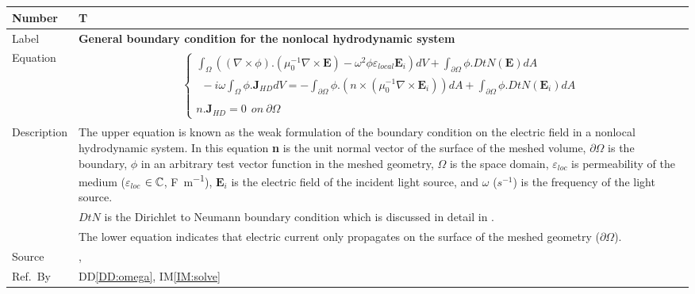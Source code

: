 \documentclass[12pt]{article}
\newcommand{\colBwidth}{0.82\textwidth} \newcommand{\colCwidth}{0.1\textwidth}
\begin{document}
	~\newline
	
	~\newline
	
	\noindent \begin{minipage}{\textwidth} \renewcommand*{\arraystretch}{1.5}
		\begin{tabular}{| p{\colAwidth} | p{\colBwidth}|} \hline \rowcolor[gray]{0.9}
			Number& T{theorynum}\thetheorynum \label{TM:boundary}\\ \hline
			Label&\bf General boundary condition for the nonlocal hydrodynamic system  \\
			\hline Equation& \begin{equation} \label{eq:boundary} \begin{gathered}
					\begin{cases} \int_\Omega ((\nabla \times \phi).(\mu^{-1}_{0} \nabla \times
						\textbf{E})- \omega^2\phi \varepsilon_{local} \textbf{E}_i)dV + \int_{\partial
							\Omega} \phi . DtN(\textbf{E})dA\\ \ \ - i\omega \int_\Omega \phi .
						\textbf{J}_{HD}dV =  -\int_{\partial \Omega} \phi.(n \times (\mu^{-1}_0 \nabla
						\times \textbf{E}_i))dA + \int_{\partial \Omega} \phi.DtN(\textbf{E}_i)dA \\ \\
						n.\textbf{J}_{HD}=0 \ \ on \ \partial \Omega \end{cases} \end{gathered}
			\end{equation} \\
			
			
			\hline Description & The upper equation is known as the weak formulation of
			the boundary condition on the electric field in a nonlocal hydrodynamic
			system. In this equation \textbf{n} is the unit normal vector of the surface
			of the meshed volume, $\partial \Omega$ is the boundary, $\phi$ in an
			arbitrary test vector function in the meshed geometry, $\Omega$ is the space
			domain, $\varepsilon_{loc}$ is permeability of the medium
			($\varepsilon_{loc}$ $\in \Bbb C$, \si{\farad \per \meter}), $\textbf{E}_i$
			is the electric field of the incident light source, and $\omega$ ($s^{-1}$)
			is the frequency of the light source. \\ &$DtN$ is the Dirichlet to Neumann
			boundary condition which is discussed in detail in \cite{monk2003finite}. \\
			& The lower equation indicates that electric current only propagates on the
			surface of the meshed geometry ($\partial \Omega$). \\ \hline Source &
			\cite{hiremath2012numerical}, \cite{monk2003finite} \\ %
			\hline Ref.\ By & DD\ref{DD:omega}, IM\ref{IM:solve}\\ \hline \end{tabular}
	\end{minipage}\\
	
\end{document}
